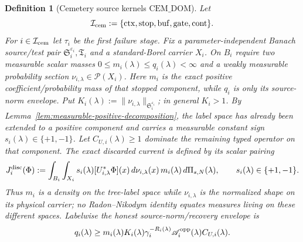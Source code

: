 \documentclass[11pt]{article}
\newtheorem{definition}[theorem]{Definition}
\begin{document}
\begin{definition}[Cemetery source kernels
$\mathrm{CEM\_DOM}$]
\label{def:cemetery-source-domination}
Let
\[
 \mathcal I_{\rm cem}:=
 \{\mathrm{ctx},\mathrm{stop},\mathrm{buf},
   \mathrm{gate},\mathrm{cont}\}.
\]
For $i\in\mathcal I_{\rm cem}$ let
$\tau_i$ be the first failure stage.  Fix a parameter-independent Banach
source/test pair
$\mathfrak S_i^{\varepsilon_i},\mathfrak T_i$ and a standard-Borel carrier
$X_i$.  On $B_i$ require two measurable scalar masses
$0\le m_i(\lambda)\le q_i(\lambda)<\infty$ and a weakly measurable
probability section $\nu_{i,\lambda}\in\mathcal P(X_i)$.  Here $m_i$ is the
exact positive coefficient/probability mass of that stopped component, while $q_i$ is
only its source-norm envelope.  Put
$K_i(\lambda):=\|\nu_{i,\lambda}\|_{\mathfrak S_i^{\varepsilon_i}}$; in
general $K_i>1$.  By Lemma~\ref{lem:measurable-positive-decomposition}, the
label space has already been extended to a positive component and carries a
measurable constant sign $s_i(\lambda)\in\{+1,-1\}$.  Let
$C_{U,i}(\lambda)\ge1$ dominate the remaining typed operator on that
component.  The exact discarded current is
defined by its scalar pairing
\begin{equation}
\label{eq:exact-stopped-source-factorization}
 J_i^{\rm disc}(\Phi):=
 \int_{B_i}\int_{X_i}
   s_i(\lambda)[U_{i,\lambda}^{*}\Phi](x)
   \,d\nu_{i,\lambda}(x)\,m_i(\lambda)\,d\Pi_{s,N}(\lambda),
 \qquad s_i(\lambda)\in\{+1,-1\}.
\end{equation}
Thus $m_i$ is a density on the tree-label space while $\nu_{i,\lambda}$ is
the normalized shape on its physical carrier; no Radon--Nikodym identity
equates measures living on these different spaces.  Labelwise the honest
source-norm/recovery envelope is
\begin{equation}
\label{eq:cemetery-fixed-source-norm}
 q_i(\lambda)\ge
 m_i(\lambda)K_i(\lambda)\gamma_i^{-R_i(\lambda)}
 \mathscr A_i^{\rm opp}(\lambda)C_{U,i}(\lambda).
\end{equation}


\end{definition}
\end{document}
